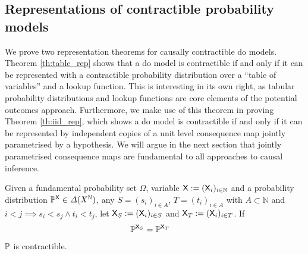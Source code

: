 


\subsection{Representations of contractible probability models}

We prove two representation theorems for causally contractible do models. Theorem \ref{th:table_rep} shows that a do model is contractible if and only if it can be represented with a contractible probability distribution over a ``table of variables'' and a lookup function. This is interesting in its own right, as tabular probability distributions and lookup functions are core elements of the potential outcomes approach. Furthermore, we make use of this theorem in proving Theorem \ref{th:iid_rep}, which shows a do model is contractible if and only if it can be represented by independent copies of a unit level consequence map jointly parametrised by a hypothesis. We will argue in the next section that jointly parametrised consequence maps are fundamental to all approaches to causal inference.

\begin{definition}
Given a fundamental probability set $\Omega$, variable $\mathsf{X}:=(\mathsf{X}_i)_{i\in \mathbb{N}}$ and a probability distribution $\mathbb{P}^{\mathsf{X}}\in\Delta(X^{\mathbb{N}})$, any $S=(s_i)_{i\in A}$, $T=(t_i)_{i\in A}$ with $A\subset\mathbb{N}$ and $i<j\implies s_i<s_j \land t_i<t_j$, let $\mathsf{X}_S:=(\mathsf{X}_i)_{i\in S}$ and $\mathsf{X}_T:=(\mathsf{X}_i)_{i\in T}$. If
\begin{align}
    \mathbb{P}^{\mathsf{X}_S} &= \mathbb{P}^{\mathsf{X}_T}
\end{align}
 $\mathbb{P}$ is contractible.
\end{definition}

